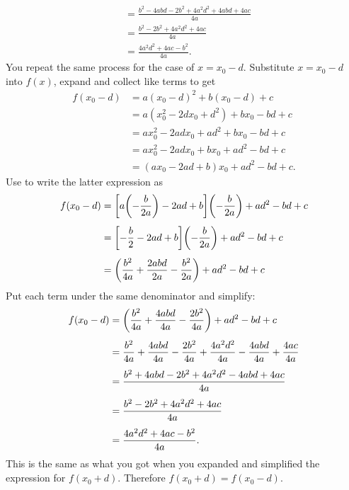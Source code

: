 \documentclass[a4paper,oneside,12pt]{article}
\begin{document}
\begin{problem}
{\begin{solution}
\begin{align*}
&=
\frac{
  b^2 - 4abd - 2b^2 + 4a^2d^2 + 4abd + 4ac
}{
  4a
} \\[4pt]
&=
\frac{
  b^2 - 2b^2 + 4a^2d^2 + 4ac
}{
  4a
} \\[4pt]
&=
\frac{
  4a^2d^2 + 4ac - b^2
}{
  4a
}.
\end{align*}
You repeat the same process for the case of $x = x_0 - d$.  Substitute
$x = x_0 - d$ into $f(x)$, expand and collect like terms to get
\begin{align*}
f(x_0 - d)
&=
a(x_0 - d)^2 + b(x_0 - d) + c \\[4pt]
&=
a(x_0^2 - 2dx_0 + d^2) + bx_0 - bd + c \\[4pt]
&=
ax_0^2 - 2adx_0 + ad^2 + bx_0 - bd + c \\[4pt]
&=
ax_0^2 - 2adx_0 + bx_0 + ad^2 - bd + c \\[4pt]
&=
(ax_0 - 2ad + b)x_0 + ad^2 - bd + c.
\end{align*}
Use  to write the
latter expression as
\begin{align*}
f(x_0 - d)
&=
\squarebracket*{
  a\parenthesis*{-\frac{b}{2a}} - 2ad + b
}
\parenthesis*{-\frac{b}{2a}} + ad^2 - bd + c \\[4pt]
&=
\squarebracket*{
  -\frac{b}{2} - 2ad + b
}
\parenthesis*{-\frac{b}{2a}} + ad^2 - bd + c \\[4pt]
&=
\parenthesis*{
  \frac{b^2}{4a} + \frac{2abd}{2a} - \frac{b^2}{2a}
}
+ ad^2 - bd + c
\end{align*}
Put each term under the same denominator and simplify:
\begin{align*}
f(x_0 - d)
&=
\parenthesis*{
  \frac{b^2}{4a} + \frac{4abd}{4a} - \frac{2b^2}{4a}
}
+ ad^2 - bd + c \\[4pt]
&=
\frac{b^2}{4a} + \frac{4abd}{4a} - \frac{2b^2}{4a}
+ \frac{4a^2d^2}{4a} - \frac{4abd}{4a} + \frac{4ac}{4a} \\[4pt]
&=
\frac{
  b^2 + 4abd - 2b^2 + 4a^2d^2 - 4abd + 4ac
}{
  4a
} \\[4pt]
&=
\frac{
  b^2 - 2b^2 + 4a^2d^2 + 4ac
}{
  4a
} \\[4pt]
&=
\frac{
  4a^2d^2 + 4ac - b^2
}{
  4a
}.
\end{align*}
This is the same as what you got when you expanded and simplified the
expression for $f(x_0 + d)$.  Therefore $f(x_0 + d) = f(x_0 - d)$.
\end{solution}
}{}
\end{problem}
\end{document}
